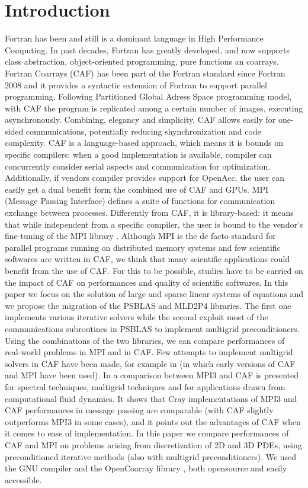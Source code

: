 \documentclass{IOS-Book-Article}
\begin{document}
\section{Introduction}
Fortran has been and still is a dominant language in High Performance Computing. In past decades, Fortran has greatly developed,  and now supports class abstraction, object-oriented programming, pure functions an coarrays\cite{r7}. 
Fortran Coarrays (CAF) has been part of the Fortran standard since Fortran 2008 and it provides a syntactic extension of Fortran to support parallel programming.  
Following Partitioned Global Adress Space programming model, with CAF the program is replicated among a certain number of images, executing asynchronously.
Combining, elegancy and simplicity, CAF allows easily for one-sided communications, potentially reducing shynchronization and code complexity.
CAF is a language-based approach, which means it is bounds on specific compilers: when a good implementation is available, compiler can concurrently consider serial aspects and communication for optimization. Additionally, if vendors compiler provides support for OpenAcc, the user can easily get a dual benefit form the combined use of CAF and GPUs.  
MPI (Message Passing Interface) defines a suite of functions for communication exchange between processes. Differently from CAF, it is library-based: it means that while independent from a specific compiler, the user is bound to the vendor's fine-tuning of the MPI library \cite{r4}.
Although MPI is the de facto standard for parallel programs running on distributed memory systems and few scientific softwares are written in CAF, we think that many scientific applications could benefit from the use of CAF. For this to be possible, studies have to be carried on the impact of CAF on performances and quality of scientific softwares.
In this paper we focus on the solution of large and sparse linear systems of equations and we propose the migration of the PSBLAS\cite{r1} and MLD2P4\cite{r2} libraries. The first one implements various iterative solvers while the second exploit most of the communications subroutines in PSBLAS to implement multigrid preconditioners. Using the combinations of the two libraries, we can compare performances of real-world problems in MPI and in CAF.
Few attempts to implement multigrid solvers in CAF have been made, for example in \cite{r3} (in which early versions of CAF and MPI have been used).  In \cite{r4} a comparison between MPI3 and CAF is presented for spectral techniques, multigrid techniques and for applications drawn from computational fluid dynamics. It shows that Cray implementations of MPI3 and CAF performances in message passing are comparable (with CAF slightly outperforms MPI3 in some cases), and it points out the advantages of CAF when it comes to ease of implementation.
In this paper we compare performances of CAF and MPI on problems arising from discretization of 2D and 3D PDEs, using preconditioned iterative methods (also with multigrid preconditioners). We used the GNU compiler and the OpenCoarray library \cite{r5}, both opensource and easily accessible.
\end{document}
